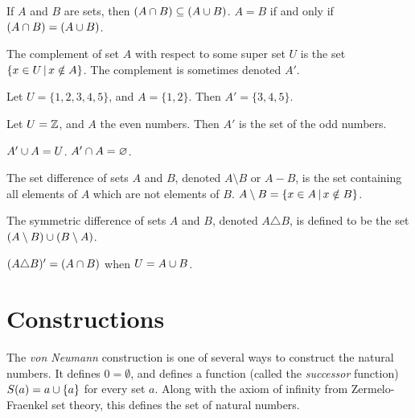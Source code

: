 \begin{rmk}
    If $A$ and $B$ are sets, then $(A \cap B) \subseteq (A \cup B)$. $A = B$ if and only if $(A \cap B) = (A \cup B)$.
\end{rmk}

\begin{defn}
    The complement of set $A$ with respect to some super set $U$ is the set $\left\{x \in U \,\middle|\, x \notin A\right\}$. The complement is sometimes denoted $A'$.
\end{defn}

\begin{exmp}
    Let $U = \{1, 2, 3, 4, 5\}$, and $A = \{1, 2\}$. Then $A' = \{3, 4, 5\}$.
\end{exmp}

\begin{exmp}
    Let $U = \mathbb{Z}$, and $A$ the even numbers. Then $A'$ is the set of the odd numbers.
\end{exmp}

\begin{rmk}
    $A' \cup A = U$. $A' \cap A = \varnothing$.
\end{rmk}

\begin{defn}\label{set-difference}
    The set difference of sets $A$ and  $B$, denoted $A \setminus B$ or $A - B$, is the set containing all elements of $A$ which are not elements of $B$. $A \setminus B = \left\{x \in A \,\middle|\, x \notin B\right\}$.
\end{defn}

\begin{defn}\label{symmetric-difference}
    The symmetric difference of sets $A$ and $B$, denoted $A \triangle B$, is defined to be the set $(A \setminus B) \cup (B \setminus A)$.
\end{defn}

\begin{rmk}
    $(A \triangle B)' = (A \cap B)$ when $U = A \cup B$.
\end{rmk}

\section{Constructions}

The \emph{von Neumann} construction is one of several ways to construct the natural numbers. It defines $0 = \emptyset$, and defines a function (called the \emph{successor} function) $S(a) = a \cup \{a\}$ for every set $a$. Along with the axiom of infinity from Zermelo-Fraenkel set theory, this defines the set of natural numbers.

